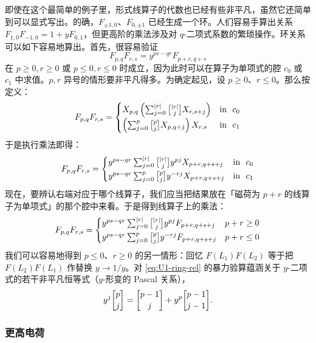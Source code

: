 即使在这个最简单的例子里，形式线算子的代数也已经有些非平凡，虽然它还简单到可以显式写出。的确，$F_{\pm1,0}$、$F_{0,\pm1}$ 已经生成一个环。人们容易手算出关系 $F_{1,0}F_{-1,0}=1+yF_{0,1}$，但更高阶的乘法涉及对 $q$-二项式系数的繁琐操作。环关系可以如下容易地算出。首先，很容易验证
\begin{equation}
F_{p,q}F_{r,s} = y^{ps-qr}F_{p+r,q+s}
\end{equation}
在 $p\geq 0,r\geq 0$ 或 $p\leq 0,r\leq 0$ 时成立，因为此时可以在算子为单项式的腔 $c_0$ 或 $c_1$ 中求值。$p,r$ 异号的情形要非平凡得多。为确定起见，设 $p\geq 0$、$r\leq 0$。那么按定义：
\begin{equation}
F_{p,q}F_{r,s} = \begin{cases}
X_{p,q}\left(\sum_{j=0}^{|r|}\qbinom{|r|}{j} X_{r,s+j}\right) & {\rm in}~~c_0 \\[2pt]
\left(\sum_{j=0}^p \qbinom{p}{j} X_{p,q+j}\right) X_{r,s} & {\rm in}~~c_1
\end{cases}
\end{equation}
于是执行乘法即得：
\begin{equation}
F_{p,q}F_{r,s} = \begin{cases}
y^{ps-qr}\sum_{j=0}^{|r|}\qbinom{|r|}{j} y^{pj} X_{p+r,q+s+j} & {\rm in}~~c_0 \\[2pt]
y^{ps-qr}\sum_{j=0}^p \qbinom{p}{j} y^{-rj} X_{p+r,q+s+j} & {\rm in}~~c_1
\end{cases}
\end{equation}
现在，要辨认右端对应于哪个线算子，我们应当把结果放在「磁荷为 $p+r$ 的线算子为单项式」的那个腔中来看。于是得到线算子上的乘法：
\begin{equation}\label{eq:U1-ring-rel}
F_{p,q}F_{r,s} = \begin{cases}
y^{ps-qr}\sum_{j=0}^{|r|}\qbinom{|r|}{j} y^{pj} F_{p+r,q+s+j} & p+r \geq 0 \\[2pt]
y^{ps-qr}\sum_{j=0}^p \qbinom{p}{j} y^{-rj} F_{p+r,q+s+j} & p+r \leq 0
\end{cases}
\end{equation}
我们可以容易地得到 $p\leq 0$、$r\geq 0$ 的另一情形：回忆 $F(L_1)F(L_2)$ 等于把 $F(L_2)F(L_1)$ 作替换 $y\to 1/y$。对 \eqref{eq:U1-ring-rel} 的暴力验算蕴涵关于 $y$-二项式的若干非平凡恒等式（$y$-形变的 Pascal 关系），
\begin{equation}
y^j \qbinom{p}{j} = \qbinom{p-1}{j} + y^p \qbinom{p-1}{j-1}.
\end{equation}

\subsubsection*{更高电荷}

